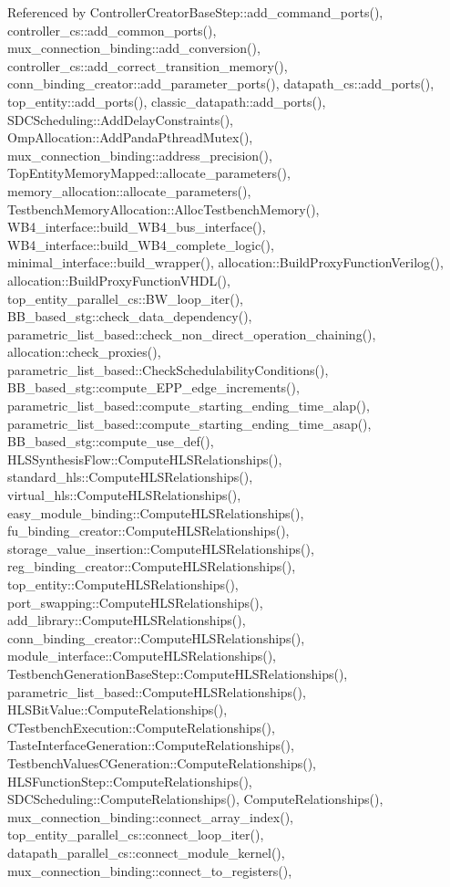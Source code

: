Referenced by Controller\+Creator\+Base\+Step\+::add\+\_\+command\+\_\+ports(), controller\+\_\+cs\+::add\+\_\+common\+\_\+ports(), mux\+\_\+connection\+\_\+binding\+::add\+\_\+conversion(), controller\+\_\+cs\+::add\+\_\+correct\+\_\+transition\+\_\+memory(), conn\+\_\+binding\+\_\+creator\+::add\+\_\+parameter\+\_\+ports(), datapath\+\_\+cs\+::add\+\_\+ports(), top\+\_\+entity\+::add\+\_\+ports(), classic\+\_\+datapath\+::add\+\_\+ports(), S\+D\+C\+Scheduling\+::\+Add\+Delay\+Constraints(), Omp\+Allocation\+::\+Add\+Panda\+Pthread\+Mutex(), mux\+\_\+connection\+\_\+binding\+::address\+\_\+precision(), Top\+Entity\+Memory\+Mapped\+::allocate\+\_\+parameters(), memory\+\_\+allocation\+::allocate\+\_\+parameters(), Testbench\+Memory\+Allocation\+::\+Alloc\+Testbench\+Memory(), W\+B4\+\_\+interface\+::build\+\_\+\+W\+B4\+\_\+bus\+\_\+interface(), W\+B4\+\_\+interface\+::build\+\_\+\+W\+B4\+\_\+complete\+\_\+logic(), minimal\+\_\+interface\+::build\+\_\+wrapper(), allocation\+::\+Build\+Proxy\+Function\+Verilog(), allocation\+::\+Build\+Proxy\+Function\+V\+H\+D\+L(), top\+\_\+entity\+\_\+parallel\+\_\+cs\+::\+B\+W\+\_\+loop\+\_\+iter(), B\+B\+\_\+based\+\_\+stg\+::check\+\_\+data\+\_\+dependency(), parametric\+\_\+list\+\_\+based\+::check\+\_\+non\+\_\+direct\+\_\+operation\+\_\+chaining(), allocation\+::check\+\_\+proxies(), parametric\+\_\+list\+\_\+based\+::\+Check\+Schedulability\+Conditions(), B\+B\+\_\+based\+\_\+stg\+::compute\+\_\+\+E\+P\+P\+\_\+edge\+\_\+increments(), parametric\+\_\+list\+\_\+based\+::compute\+\_\+starting\+\_\+ending\+\_\+time\+\_\+alap(), parametric\+\_\+list\+\_\+based\+::compute\+\_\+starting\+\_\+ending\+\_\+time\+\_\+asap(), B\+B\+\_\+based\+\_\+stg\+::compute\+\_\+use\+\_\+def(), H\+L\+S\+Synthesis\+Flow\+::\+Compute\+H\+L\+S\+Relationships(), standard\+\_\+hls\+::\+Compute\+H\+L\+S\+Relationships(), virtual\+\_\+hls\+::\+Compute\+H\+L\+S\+Relationships(), easy\+\_\+module\+\_\+binding\+::\+Compute\+H\+L\+S\+Relationships(), fu\+\_\+binding\+\_\+creator\+::\+Compute\+H\+L\+S\+Relationships(), storage\+\_\+value\+\_\+insertion\+::\+Compute\+H\+L\+S\+Relationships(), reg\+\_\+binding\+\_\+creator\+::\+Compute\+H\+L\+S\+Relationships(), top\+\_\+entity\+::\+Compute\+H\+L\+S\+Relationships(), port\+\_\+swapping\+::\+Compute\+H\+L\+S\+Relationships(), add\+\_\+library\+::\+Compute\+H\+L\+S\+Relationships(), conn\+\_\+binding\+\_\+creator\+::\+Compute\+H\+L\+S\+Relationships(), module\+\_\+interface\+::\+Compute\+H\+L\+S\+Relationships(), Testbench\+Generation\+Base\+Step\+::\+Compute\+H\+L\+S\+Relationships(), parametric\+\_\+list\+\_\+based\+::\+Compute\+H\+L\+S\+Relationships(), H\+L\+S\+Bit\+Value\+::\+Compute\+Relationships(), C\+Testbench\+Execution\+::\+Compute\+Relationships(), Taste\+Interface\+Generation\+::\+Compute\+Relationships(), Testbench\+Values\+C\+Generation\+::\+Compute\+Relationships(), H\+L\+S\+Function\+Step\+::\+Compute\+Relationships(), S\+D\+C\+Scheduling\+::\+Compute\+Relationships(), Compute\+Relationships(), mux\+\_\+connection\+\_\+binding\+::connect\+\_\+array\+\_\+index(), top\+\_\+entity\+\_\+parallel\+\_\+cs\+::connect\+\_\+loop\+\_\+iter(), datapath\+\_\+parallel\+\_\+cs\+::connect\+\_\+module\+\_\+kernel(), mux\+\_\+connection\+\_\+binding\+::connect\+\_\+to\+\_\+registers(), 